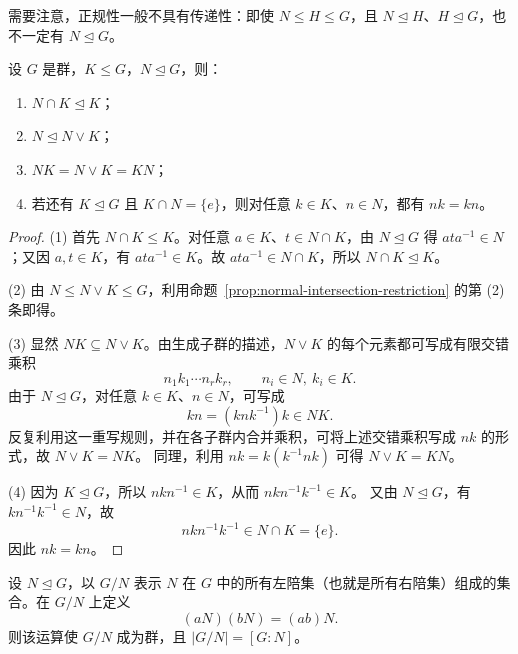 \begin{purplenote}
需要注意，正规性一般不具有传递性：即使 $N\leq H\leq G$，且 $N\trianglelefteq H$、$H\trianglelefteq G$，也不一定有 $N\trianglelefteq G$。
\end{purplenote}

\begin{theorem}\label{thm:normal-product}
设 $G$ 是群，$K\leq G$，$N\trianglelefteq G$，则：
\begin{enumerate}[label=(\arabic*)]
  \item $N\cap K\trianglelefteq K$；
  \item $N\trianglelefteq N\vee K$；
  \item $NK=N\vee K=KN$；
  \item 若还有 $K\trianglelefteq G$ 且 $K\cap N=\{e\}$，则对任意 $k\in K$、$n\in N$，都有 $nk=kn$。
\end{enumerate}
\end{theorem}

\begin{proof}
(1) 首先 $N\cap K\leq K$。对任意 $a\in K$、$t\in N\cap K$，由 $N\trianglelefteq G$ 得 $ata^{-1}\in N$；又因 $a,t\in K$，有 $ata^{-1}\in K$。故 $ata^{-1}\in N\cap K$，所以 $N\cap K\trianglelefteq K$。

(2) 由 $N\leq N\vee K\leq G$，利用命题~\ref{prop:normal-intersection-restriction} 的第 (2) 条即得。

(3) 显然 $NK\subseteq N\vee K$。由生成子群的描述，$N\vee K$ 的每个元素都可写成有限交错乘积
\[
  n_1k_1\cdots n_rk_r,\qquad n_i\in N,\ k_i\in K.
\]
由于 $N\trianglelefteq G$，对任意 $k\in K$、$n\in N$，可写成
\[
  kn=(knk^{-1})k\in NK.
\]
反复利用这一重写规则，并在各子群内合并乘积，可将上述交错乘积写成 $nk$ 的形式，故 $N\vee K=NK$。
同理，利用 $nk=k(k^{-1}nk)$ 可得 $N\vee K=KN$。

(4) 因为 $K\trianglelefteq G$，所以 $nkn^{-1}\in K$，从而 $nkn^{-1}k^{-1}\in K$。
又由 $N\trianglelefteq G$，有 $kn^{-1}k^{-1}\in N$，故
\[
  nkn^{-1}k^{-1}\in N\cap K=\{e\}.
\]
因此 $nk=kn$。
\end{proof}

\begin{theorem}\label{thm:quotient-group-construction}
设 $N\trianglelefteq G$，以 $G/N$ 表示 $N$ 在 $G$ 中的所有左陪集（也就是所有右陪集）组成的集合。在 $G/N$ 上定义
\[
  (aN)(bN)=(ab)N.
\]
则该运算使 $G/N$ 成为群，且 $|G/N|=[G:N]$。
\end{theorem}

